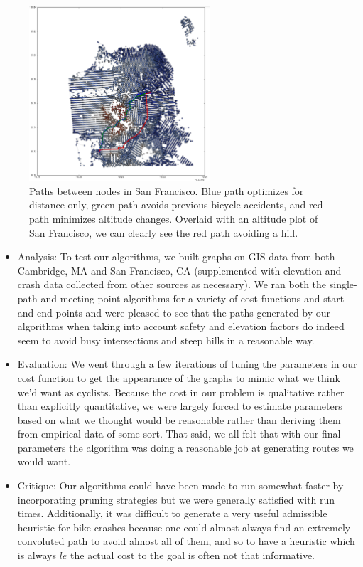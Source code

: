 \documentclass[11pt]{article}
\begin{document}
\begin{figure}
\label{connected_san_fran}
\center
\caption{Paths between nodes in San Francisco. Blue path optimizes for distance only, green path avoids previous bicycle accidents, and red path minimizes altitude changes. Overlaid with an altitude plot of San Francisco, we can clearly see the red path avoiding a hill.}
\includegraphics[width=0.6\textwidth]{sf_new_plot_2.png}
\end{figure}

\begin{itemize}

\item{Analysis:} To test our algorithms, we built graphs on GIS data from both Cambridge, MA and San Francisco, CA (supplemented with elevation and crash data collected from other sources as necessary). We ran both the single-path and meeting point algorithms for a variety of cost functions and start and end points and were pleased to see that the paths generated by our algorithms when taking into account safety and elevation factors do indeed seem to avoid busy intersections and steep hills in a reasonable way.

\item{Evaluation:} We went through a few iterations of tuning the parameters in our cost function to get the appearance of the graphs to mimic what we think we'd want as cyclists. Because the cost in our problem is qualitative rather than explicitly quantitative, we were largely forced to estimate parameters based on what we thought would be reasonable rather than deriving them from empirical data of some sort. That said, we all felt that with our final parameters the algorithm was doing a reasonable job at generating routes we would want.

\item{Critique:} Our algorithms could have been made to run somewhat faster by incorporating pruning strategies but we were generally satisfied with run times. Additionally, it was difficult to generate a very useful admissible heuristic for bike crashes because one could almost always find an extremely convoluted path to avoid almost all of them, and so to have a heuristic which is always $le$ the actual cost to the goal is often not that informative.

\end{itemize}
\end{document}

